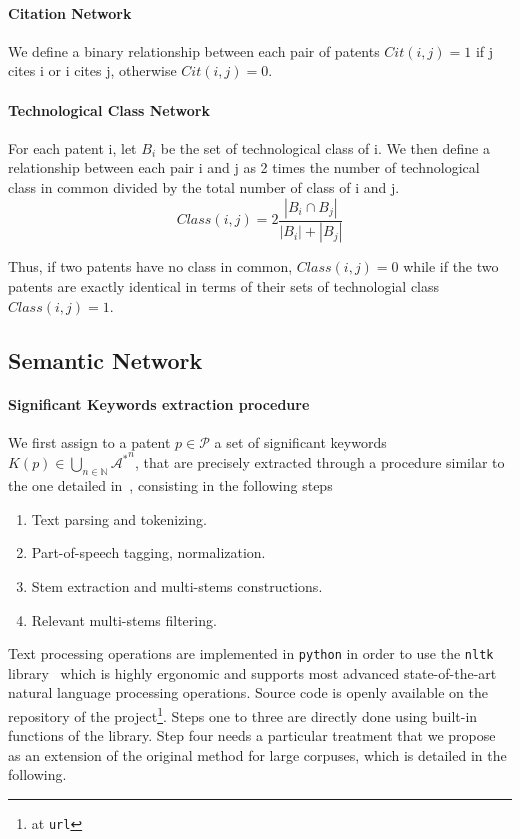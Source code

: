 \paragraph{Citation Network}

We define a binary relationship between each pair of patents $Cit(i, j) = 1$ if j cites i or i cites j, otherwise $Cit(i, j) = 0$. 

\paragraph{Technological Class Network}

For each patent i, let $B_i$ be the set of technological class of i. We then define a relationship between each pair i and j as 2 times the number of technological class in common divided by the total number of class of i and j. 
\[
Class(i,j) = 2\frac{\left\vert{B_i\cap B_j}\right\vert}{\left\vert{B_i}\right\vert+\left\vert{B_j}\right\vert}
\]

Thus, if two patents have no class in common, $Class(i,j)=0$ while if the two patents are exactly identical in terms of their sets of technologial class $Class(i,j)=1$.




\subsection{Semantic Network}

\paragraph{Significant Keywords extraction procedure}

We first assign to a patent $p \in \mathcal{P}$ a set of significant keywords $K(p)\in \bigcup_{n\in \mathbb{N}} {\mathcal{A}^{\ast}}^n$, that are precisely extracted through a procedure similar to the one detailed in~\cite{chavalarias2013phylomemetic}, consisting in the following steps
\begin{enumerate}
\item Text parsing and tokenizing.
\item Part-of-speech tagging, normalization.
\item Stem extraction and multi-stems constructions.
\item Relevant multi-stems filtering.
\end{enumerate}

Text processing operations are implemented in \texttt{python} in order to use the \texttt{nltk} library~\cite{} %
which is highly ergonomic and supports most advanced state-of-the-art natural language processing operations. Source code is openly available on the repository of the project\footnote{at \texttt{url}}.
Steps one to three are directly done using built-in functions of the library. Step four needs a particular treatment that we propose as an extension of the original method for large corpuses, which is detailed in the following.

